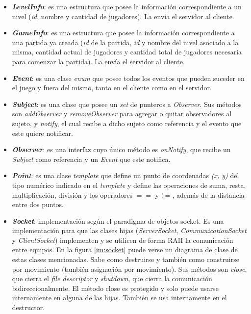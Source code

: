 \begin{itemize}
	\item \textbf{\textit{LevelInfo}}: es una estructura que posee la información correspondiente a un nivel (\textit{id}, nombre y cantidad de jugadores). La envía el servidor al cliente.
	
	\item \textbf{\textit{GameInfo}}: es una estructura que posee la información correspondiente a una partida ya creada (\textit{id} de la partida, \textit{id} y nombre del nivel asociado a la misma, cantidad actual de jugadores y cantidad total de jugadores necesaria para comenzar la partida). La envía el servidor al cliente.
	
	\item \textbf{\textit{Event}}: es una clase \textit{enum} que posee todos los eventos que pueden suceder en el juego y fuera del mismo, tanto en el cliente como en el servidor.
	
	\item \textbf{\textit{Subject}}: es una clase que posee un \textit{set} de punteros a \textit{Observer}. Sus métodos son \textit{addObserver} y \textit{removeObserver} para agregar o quitar observadores al sujeto, y \textit{notify}, el cual recibe a dicho sujeto como referencia y el evento que este quiere notificar.
	
	\item \textbf{\textit{Observer}}: es una interfaz cuyo único método es \textit{onNotify}, que recibe un \textit{Subject} como referencia y un \textit{Event} que este notifica.
	
	\item \textbf{\textit{Point}}: es una clase \textit{template} que define un punto de coordenadas \textit{(x, y)} del tipo numérico indicado en el \textit{template} y define las operaciones de suma, resta, multiplicación, división y los operadores $==$ y  $!=$, además de la distancia entre dos puntos.
	
	\item \textbf{\textit{Socket}}: implementación según el paradigma de objetos socket. Es una implementación para que las clases hijas (\emph{ServerSocket}, \emph{CommunicationSocket} y \emph{ClientSocket}) implementen y se utilicen de forma RAII la comunicación entre equipos. En la figura \ref{im:socket} puede verse un diagrama de clase de estas clases mencionadas. Sabe como destruirse y también como construirse por movimiento (también asignación por movimiento). Sus métodos son \textit{close}, que cierra el \textit{file descriptor} y \textit{shutdown}, que cierra la comunicación bidireccionalmente. El método close es protegido y solo puede usarse internamente en alguna de las hijas. También se usa internamente en el destructor.
	

\end{itemize}
